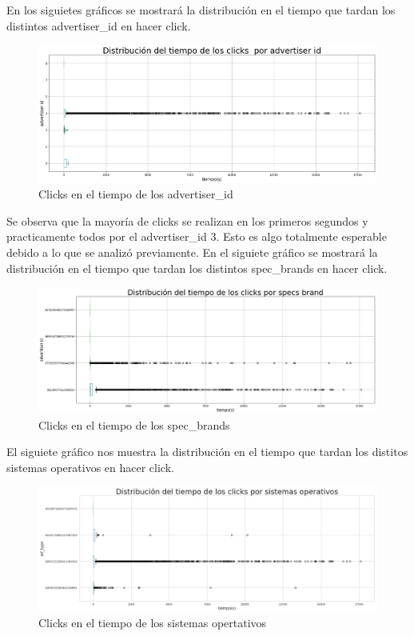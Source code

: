 \documentclass[a4paper, 12pt]{article}
\begin{document}
	
		 En los siguietes gráficos se mostrará la distribución en el tiempo que tardan los distintos advertiser\_id en hacer click.

		
		\begin{figure}[H]
			\centering
			\includegraphics[width=\textwidth]{images/clicks/clicks_advertiser_id_timeToTouch.png}
			\caption{Clicks en el tiempo de los advertiser\_id}
		\end{figure}
		


		 Se observa que la mayoría de clicks se realizan en los primeros segundos y practicamente todos por el advertiser\_id 3. Esto es algo totalmente esperable debido a lo que se analizó previamente.
		\newline
		\newline
		 En el siguiete gráfico se mostrará la distribución en el tiempo que tardan los distintos spec\_brands en hacer click.

		
		\begin{figure}[H]
			\centering
			\includegraphics[width=\textwidth]{images/clicks/clicks_specs_brand_timeToTouch.png}
			\caption{Clicks en el tiempo de los spec\_brands}
		\end{figure}
		

		 El siguiete gráfico nos muestra la distribución en el tiempo que tardan los distitos sistemas operativos en hacer click.

		
		\begin{figure}[H]
			\centering
			\includegraphics[width=\textwidth]{images/clicks/clicks_ref_type_timeToTouch.png}
			\caption{Clicks en el tiempo de los sistemas opertativos}
		\end{figure}
		
\end{document}
